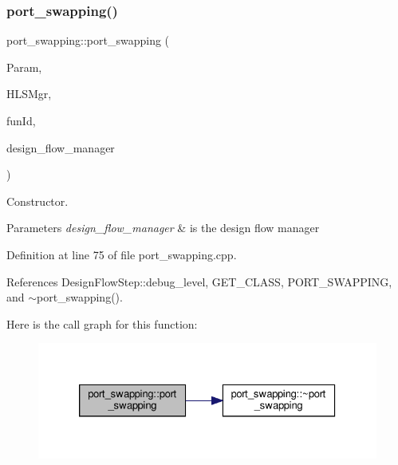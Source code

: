 \subsubsection{\texorpdfstring{port\+\_\+swapping()}{port\_swapping()}}
{\footnotesize\ttfamily port\+\_\+swapping\+::port\+\_\+swapping (\begin{DoxyParamCaption}\item[{const \hyperlink{Parameter_8hpp_a37841774a6fcb479b597fdf8955eb4ea}{Parameter\+Const\+Ref}}]{Param,  }\item[{const \hyperlink{hls__manager_8hpp_acd3842b8589fe52c08fc0b2fcc813bfe}{H\+L\+S\+\_\+manager\+Ref}}]{H\+L\+S\+Mgr,  }\item[{unsigned int}]{fun\+Id,  }\item[{const Design\+Flow\+Manager\+Const\+Ref}]{design\+\_\+flow\+\_\+manager }\end{DoxyParamCaption})}



Constructor. 


\begin{DoxyParams}{Parameters}
{\em design\+\_\+flow\+\_\+manager} & is the design flow manager \\
\hline
\end{DoxyParams}


Definition at line 75 of file port\+\_\+swapping.\+cpp.



References Design\+Flow\+Step\+::debug\+\_\+level, G\+E\+T\+\_\+\+C\+L\+A\+SS, P\+O\+R\+T\+\_\+\+S\+W\+A\+P\+P\+I\+NG, and $\sim$port\+\_\+swapping().

Here is the call graph for this function\+:
\nopagebreak
\begin{figure}[H]
\begin{center}
\leavevmode
\includegraphics[width=326pt]{d6/d83/classport__swapping_a153922be16a92229d34599fbe1085441_cgraph}
\end{center}
\end{figure}
\mbox{\label{classport__swapping_a8830702aef347ef2f566ffd3f9f08a1c}} 
